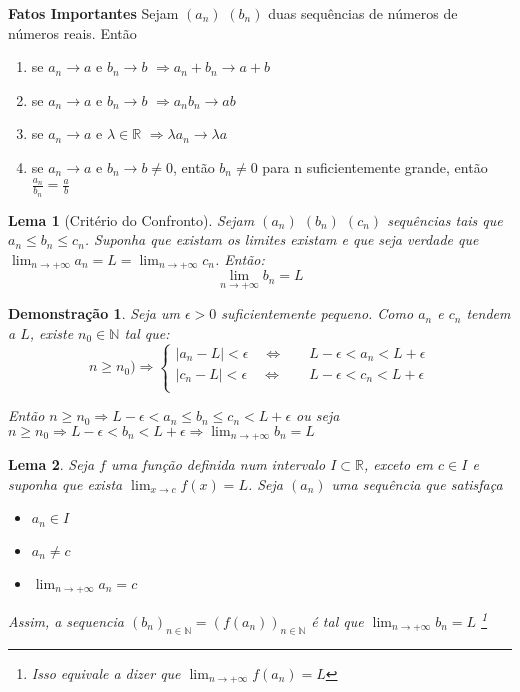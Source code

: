 \documentclass[12pt,openany]{book}
\newtheorem{lemma}{Lema}[section]
\newtheorem{demonstration}{Demonstração}
\begin{document}
\textbf{Fatos Importantes}
\hspace{5mm} Sejam $(a_n)$ $(b_n)$ duas sequências de números de números reais. Então \begin{enumerate}
\item se $a_n \rightarrow a $ e $b_n \rightarrow b$ $\Rightarrow a_n + b_n \rightarrow a + b$
\item se $a_n \rightarrow a $ e $b_n \rightarrow b$ $\Rightarrow a_nb_n \rightarrow ab$
\item se $a_n \rightarrow a $ e $\lambda \in \mathds{R}$ $\Rightarrow \lambda a_n \rightarrow \lambda a$
\item se $a_n \rightarrow a $ e $b_n \rightarrow b \neq 0$, então $b_n \neq 0$ para n suficientemente grande, então $\displaystyle{\frac{a_n}{b_n} = \frac{a}{b}}$
\end{enumerate}

\begin{lemma}[Critério do Confronto]
Sejam $(a_n)$ $(b_n)$ $(c_n)$ sequências tais que $a_n \leq b_n \leq c_n$. Suponha que existam os limites existam e que seja verdade que $\displaystyle{\lim_{n \rightarrow + \infty} a_n = L = \lim_{n \rightarrow + \infty} c_n}$. Então: $$\lim_{n \rightarrow + \infty} b_n = L$$
\end{lemma}

\begin{demonstration}
Seja um $\epsilon > 0$ suficientemente pequeno. Como $a_n$ e  $c_n$ tendem a $L$, existe $n_0 \in \mathds{N}$ tal que:
\[ n \geq n_0) \Rightarrow
  \begin{cases}
    |a_n - L| < \epsilon \quad \Longleftrightarrow  & \quad L - \epsilon < a_n < L +\epsilon \\
    |c_n - L| < \epsilon \quad \Longleftrightarrow  & \quad L - \epsilon < c_n < L +\epsilon \\
  \end{cases}
\]

Então $n \geq n_0 \Rightarrow L - \epsilon < a_n \leq b_n \leq c_n < L + \epsilon$ ou seja $n \geq n_0 \Rightarrow L- \epsilon < b_n < L + \epsilon \Rightarrow \displaystyle{\lim_{n \rightarrow + \infty} b_n = L}$
\end{demonstration}

\begin{lemma}
Seja $f$ uma função definida num intervalo $I \subset \mathds{R}$, exceto em $c \in I$ e suponha que exista $\displaystyle{\lim_{x \rightarrow c} f(x) = L}$. Seja $(a_n)$ uma sequência que satisfaça \begin{itemize}
\item [a.] $a_n \in I$
\item [b.] $a_n \neq c $
\item [c.] $\displaystyle{\lim_{n \rightarrow + \infty} a_n = c} $
\end{itemize}
Assim, a sequencia $(b_n)_{n \in \mathds{N}} =(f(a_n))_{n \in \mathds{N}}$ é tal que $\displaystyle{\lim_{n \rightarrow + \infty} b_n = L}$ \footnote{Isso equivale a dizer que $\displaystyle{\lim_{n \rightarrow + \infty} f(a_n) = L} $}
\end{lemma}
\end{document}
